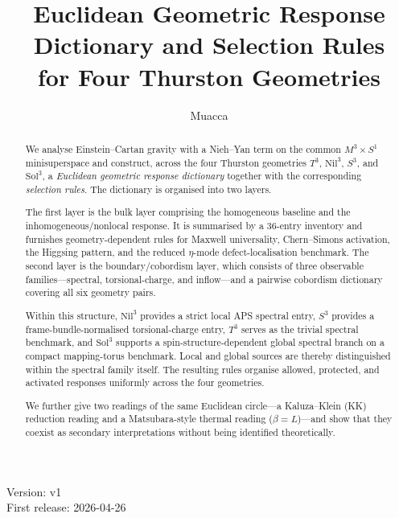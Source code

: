 \documentclass[12pt,a4paper]{article}
\title{Euclidean Geometric Response Dictionary and Selection Rules\\
for Four Thurston Geometries}
\author{Muacca}
\date{}
\theoremstyle{definition}
\theoremstyle{remark}
\newcommand{\Sthree}{S^3}
\newcommand{\Tthree}{T^3}
\newcommand{\Nilthree}{\mathrm{Nil}^3}
\newcommand{\Solthree}{\mathrm{Sol}^3}
\newcommand{\Sone}{S^1}
\begin{document}

\maketitle
\begin{center}
Version: v1\\
First release: 2026-04-26
\end{center}

\begin{abstract}
We analyse Einstein--Cartan gravity with a Nieh--Yan term on the common
$M^3\times\Sone$ minisuperspace and construct, across the four Thurston
geometries $\Tthree$, $\Nilthree$, $\Sthree$, and $\Solthree$, a
\emph{Euclidean geometric response dictionary} together with the corresponding
\emph{selection rules}.  The dictionary is organised into two layers.

The first layer is the bulk layer comprising the homogeneous baseline and the
inhomogeneous/nonlocal response.  It is summarised by a 36-entry inventory and
furnishes geometry-dependent rules for Maxwell universality, Chern--Simons
activation, the Higgsing pattern, and the reduced $\eta$-mode
defect-localisation benchmark.  The second layer is the boundary/cobordism
layer, which consists of three observable families---spectral,
torsional-charge, and inflow---and a pairwise cobordism dictionary covering all
six geometry pairs.

Within this structure, $\Nilthree$ provides a strict local APS spectral entry,
$\Sthree$ provides a frame-bundle-normalised torsional-charge entry, $\Tthree$
serves as the trivial spectral benchmark, and $\Solthree$ supports a
spin-structure-dependent global spectral branch on a compact mapping-torus
benchmark.  Local and global sources are thereby distinguished within the
spectral family itself.  The resulting rules organise allowed, protected, and
activated responses uniformly across the four geometries.

We further give two readings of the same Euclidean circle---a Kaluza--Klein
(KK) reduction reading and a Matsubara-style thermal reading ($\beta=L$)---and
show that they coexist as secondary interpretations without being identified
theoretically.
\end{abstract}
\end{document}
